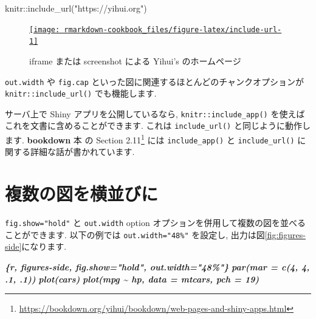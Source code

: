 \documentclass[
  11pt,
  lualatex,
  ja=standard]{bxjsreport}
\newenvironment{Shaded}{\begin{snugshade}}{\end{snugshade}}
\newcommand{\FunctionTok}[1]{\textcolor[rgb]{0.00,0.00,0.00}{#1}}
\newcommand{\InformationTok}[1]{\textcolor[rgb]{0.56,0.35,0.01}{\textbf{\textit{#1}}}}
\newcommand{\NormalTok}[1]{#1}
\newcommand{\SpecialCharTok}[1]{\textcolor[rgb]{0.00,0.00,0.00}{#1}}
\newcommand{\StringTok}[1]{\textcolor[rgb]{0.31,0.60,0.02}{#1}}
\let\oldhref\href
\renewcommand{\href}[2]{#2\footnote{\url{#1}}}
\begin{document}
\let\ooldhref\href
\let\href\oldhref

\begin{Shaded}
\begin{Highlighting}[numbers=left,,]
\NormalTok{knitr}\SpecialCharTok{::}\FunctionTok{include\_url}\NormalTok{(}\StringTok{"https://yihui.org"}\NormalTok{)}
\end{Highlighting}
\end{Shaded}

\begin{figure}

{\centering \oldhref{https://yihui.org}{\texttt{[image: rmarkdown-cookbook\_files/figure-latex/include-url-1]} }

}

\caption{iframe または screenshot による Yihui's のホームページ}\label{fig:include-url}
\end{figure}

\let\href\ooldhref

\texttt{out.width} や \texttt{fig.cap} といった図に関連するほとんどのチャンクオプションが \texttt{knitr::include\_url()} でも機能します.

サーバ上で Shiny アプリを公開しているなら, \texttt{knitr::include\_app()} を使えばこれを文書に含めることができます. これは \texttt{include\_url()} と同じように動作します. \textbf{bookdown} 本 \autocite{bookdown2016} の \href{https://bookdown.org/yihui/bookdown/web-pages-and-shiny-apps.html}{Section 2.11} には \texttt{include\_app()} と \texttt{include\_url()} に関する詳細な話が書かれています.

\hypertarget{figures-side}{%
\section{複数の図を横並びに}\label{figures-side}}

\texttt{fig.show="hold"} と \texttt{out.width} option オプションを併用して複数の図を並べることができます. 以下の例では \texttt{out.width="48\%"} を設定し, 出力は図\ref{fig:figures-side}になります.

\begin{Shaded}
\begin{Highlighting}[]
\InformationTok{\textasciigrave{}\textasciigrave{}\textasciigrave{}\{r, figures{-}side, fig.show="hold", out.width="48\%"\}}
\InformationTok{par(mar = c(4, 4, .1, .1))}
\InformationTok{plot(cars)}
\InformationTok{plot(mpg \textasciitilde{} hp, data = mtcars, pch = 19)}
\InformationTok{\textasciigrave{}\textasciigrave{}\textasciigrave{}}
\end{Highlighting}
\end{Shaded}
\end{document}

